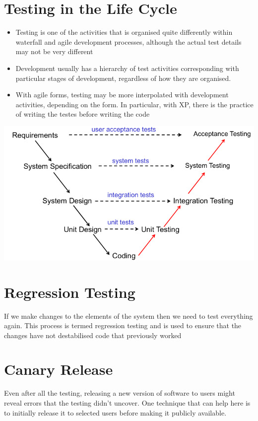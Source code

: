 \documentclass{article}[18pt]
\begin{document}
\section{Testing in the Life Cycle}
\begin{itemize}
	\item Testing is one of the activities that is organised quite differently within waterfall and agile development processes, although the actual test details may not be very different
	\item Development usually has a hierarchy of test activities corresponding with particular stages of development, regardless of how they are organised.
	\item With agile forms, testing may be more interpolated with development activities, depending on the form. In particular, with XP, there is the practice of writing the testes before writing the code
\end{itemize}
\begin{center}
	\includegraphics[scale=0.7]{"v model"}
\end{center}
\section{Regression Testing}
If we make changes to the elements of the system then we need to test everything again. This process is termed regression testing and is used to ensure that the changes have not destabilised code that previously worked
\section{Canary Release}
Even after all the testing, releasing a new version of software to users might reveal errors that the testing didn't uncover. One technique that can help here is to initially release it to selected users before making it publicly available.
\end{document}
